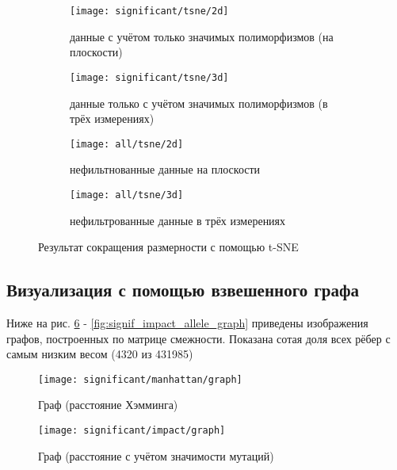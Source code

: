 \documentclass[main.tex]{subfiles}
\begin{document}
\begin{figure}[H]
    \centering
    \begin{subfigure}{.5\textwidth}
        \centering
        \texttt{[image: significant/tsne/2d]}
        \captionsetup{width=.8\linewidth}
        \caption{данные с учётом только значимых полиморфизмов (на плоскости)}
        \label{fig:signif_tsne_2d}
    \end{subfigure}%
    \begin{subfigure}{.5\textwidth}
        \centering
        \texttt{[image: significant/tsne/3d]}
        \captionsetup{width=.8\linewidth}
        \caption{данные только с учётом значимых полиморфизмов (в трёх измерениях)}
        \label{fig:signif_tsne_3d}
    \end{subfigure}

    \begin{subfigure}{.5\textwidth}
        \centering
        \texttt{[image: all/tsne/2d]}
        \captionsetup{width=.8\linewidth}
        \caption{нефильтнованные данные на плоскости}
        \label{fig:all_tsne_2d}
    \end{subfigure}%
    \begin{subfigure}{.5\textwidth}
        \centering
        \texttt{[image: all/tsne/3d]}
        \captionsetup{width=.8\linewidth}
        \caption{нефильтрованные данные в трёх измерениях}
        \label{fig:all_tsne_3d}
    \end{subfigure}
    \caption{Результат сокращения размерности с помощью t-SNE}
\end{figure}

\newpage

\subsection{Визуализация с помощью взвешенного графа}

Ниже на рис. \ref{fig:signif_manhattan_graph} - \ref{fig:signif_impact_allele_graph} приведены изображения графов, построенных по матрице смежности. Показана сотая доля всех рёбер с самым низким весом (4320 из 431985)

\begin{figure}[H]
    \centering \texttt{[image: significant/manhattan/graph]}
    \caption{Граф (расстояние Хэмминга)}
    \label{fig:signif_manhattan_graph}
\end{figure}

\begin{figure}[H]
    \centering \texttt{[image: significant/impact/graph]}
    \caption{Граф (расстояние с учётом значимости мутаций)}
    \label{fig:signif_impact_graph}
\end{figure}
\end{document}
